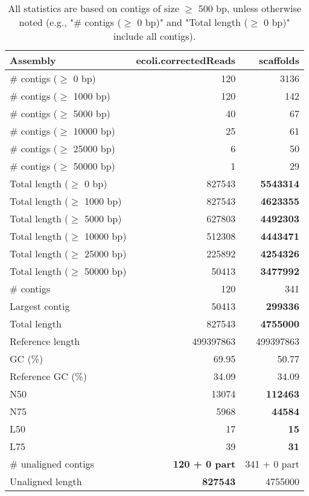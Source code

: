 \documentclass[12pt,a4paper]{article}
\begin{document}
\begin{table}[ht]
\begin{center}
\caption{All statistics are based on contigs of size $\geq$ 500 bp, unless otherwise noted (e.g., "\# contigs ($\geq$ 0 bp)" and "Total length ($\geq$ 0 bp)" include all contigs).}
\begin{tabular}{|l*{2}{|r}|}
\hline
Assembly & ecoli.correctedReads & scaffolds \\ \hline
\# contigs ($\geq$ 0 bp) & 120 & 3136 \\ \hline
\# contigs ($\geq$ 1000 bp) & 120 & 142 \\ \hline
\# contigs ($\geq$ 5000 bp) & 40 & 67 \\ \hline
\# contigs ($\geq$ 10000 bp) & 25 & 61 \\ \hline
\# contigs ($\geq$ 25000 bp) & 6 & 50 \\ \hline
\# contigs ($\geq$ 50000 bp) & 1 & 29 \\ \hline
Total length ($\geq$ 0 bp) & 827543 & {\bf 5543314} \\ \hline
Total length ($\geq$ 1000 bp) & 827543 & {\bf 4623355} \\ \hline
Total length ($\geq$ 5000 bp) & 627803 & {\bf 4492303} \\ \hline
Total length ($\geq$ 10000 bp) & 512308 & {\bf 4443471} \\ \hline
Total length ($\geq$ 25000 bp) & 225892 & {\bf 4254326} \\ \hline
Total length ($\geq$ 50000 bp) & 50413 & {\bf 3477992} \\ \hline
\# contigs & 120 & 341 \\ \hline
Largest contig & 50413 & {\bf 299336} \\ \hline
Total length & 827543 & {\bf 4755000} \\ \hline
Reference length & 499397863 & 499397863 \\ \hline
GC (\%) & 69.95 & 50.77 \\ \hline
Reference GC (\%) & 34.09 & 34.09 \\ \hline
N50 & 13074 & {\bf 112463} \\ \hline
N75 & 5968 & {\bf 44584} \\ \hline
L50 & 17 & {\bf 15} \\ \hline
L75 & 39 & {\bf 31} \\ \hline
\# unaligned contigs & {\bf 120 + 0 part} & 341 + 0 part \\ \hline
Unaligned length & {\bf 827543} & 4755000 \\ \hline

\end{tabular}
\end{center}
\end{table}
\end{document}
